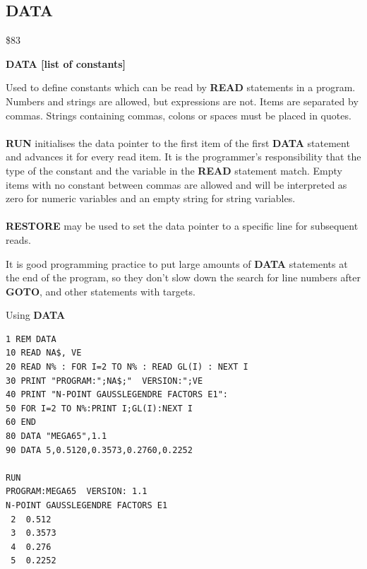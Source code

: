 
\newpage
\subsection{DATA}
\begin{description}[leftmargin=2cm,style=nextline]
\item [Token:] \$83
\item [Format:] {\bf DATA [list of constants]}
\item [Usage:] Used to define constants
               which can be read by {\bf READ} statements
               in a program. Numbers and strings are allowed, but expressions are not.
               Items are separated by commas.
               Strings containing commas, colons or spaces must be placed
               in quotes. \\
               \\
               {\bf RUN} initialises the data pointer
               to the first item of the first {\bf DATA} statement
               and advances it for every read item. It is the
               programmer's responsibility that the type of
               the constant and the variable in the {\bf READ}
               statement match. Empty items with no constant
               between commas are allowed and will be interpreted as
               zero for numeric variables and an empty string for
               string variables. \\
               \\
               {\bf RESTORE} may be used to set the
               data pointer to a specific line for subsequent
               reads.

\item [Remarks:] It is good programming practice to put large amounts of
               {\bf DATA} statements at the end of the program,
               so they don't slow down the search for line numbers
               after {\bf GOTO}, and other statements with targets.
\item [Example:] Using {\bf DATA}
\begin{tcolorbox}[colback=black,coltext=white]
\verbatimfont{\codefont}
\begin{verbatim}
1 REM DATA
10 READ NA$, VE
20 READ N% : FOR I=2 TO N% : READ GL(I) : NEXT I
30 PRINT "PROGRAM:";NA$;"  VERSION:";VE
40 PRINT "N-POINT GAUSSLEGENDRE FACTORS E1":
50 FOR I=2 TO N%:PRINT I;GL(I):NEXT I
60 END
80 DATA "MEGA65",1.1
90 DATA 5,0.5120,0.3573,0.2760,0.2252

RUN
PROGRAM:MEGA65  VERSION: 1.1
N-POINT GAUSSLEGENDRE FACTORS E1
 2  0.512
 3  0.3573
 4  0.276
 5  0.2252
\end{verbatim}
\end{tcolorbox}
\end{description}

